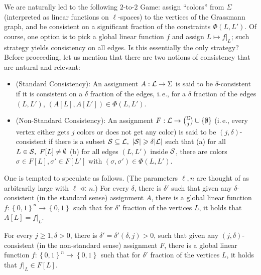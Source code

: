 \documentclass[11pt]{article}
\numberwithin{equation}{section}
\theoremstyle{definition}
\theoremstyle{plain}
\newcommand{\ie}{i.\,e.}
\newcommand\set[1]{{\left\{ #1 \right\}}}
\newcommand\power[1]{\set{0,1}^{#1}}
\renewcommand\geq{\geqslant}
\begin{document}
We are naturally led to the following $2$-to-$2$ Game: assign ``colors'' from $\Sigma$ (interpreted as linear functions on $\ell$-spaces) to the vertices
 of the Grassmann graph, and be consistent on a significant fraction of the
 constraints $\Phi(L,L')$.
 Of course, one option is to pick a global linear
 function $f$ and assign $L \mapsto f|_L$; such strategy yields consistency on all edges.
 Is this essentially the only strategy? Before proceeding, let us mention that
 there are two notions of consistency that are natural and relevant:
 \begin{itemize}
 \item (Standard Consistency): An assignment $A: {\cal L} \to \Sigma$ is said to be $\delta$-consistent if it is consistent on
 a %
 $\delta$ fraction of the
       edges, \ie, for
       a %
       $\delta$ fraction of the edges $(L, L')$, $(A[L], A[L']) \in \Phi(L, L')$.
 \item (Non-Standard Consistency): An assignment $F: {\cal L} \to {\Sigma \choose j} \cup \{\emptyset\}$ (\ie, every vertex either gets $j$ colors or
        does not get any color) is said to be $(j,\delta)$-consistent if there is a subset ${\cal S} \subseteq {\cal L}, ~|{\cal S}| \geq \delta |{\cal L}|$
        such that (a) for all $ L \in {\cal S}, ~F[L] \neq  \emptyset$ (b) for all edges $(L, L')$ inside ${\cal S}$, there are colors $\sigma\in F[L], \sigma'\in F[L']$
        with $(\sigma, \sigma') \in \Phi(L,L')$.
\end{itemize}

One is tempted to speculate %
%
%
as follows. (The parameters $\ell, n$ are thought of as arbitrarily
large with $\ell \ll n$.)  %
\medskip
{} For every $\delta$, there is $\delta'$ such that given any $\delta$-consistent (in the standard sense)
   assignment $A$, there is a global linear
function $f:\power{n} \to \power{}$ such that for $\delta'$ fraction of the vertices $L$, it holds that $A[L] = f|_L$.

\medskip
{} For every $j \geq 1, \delta > 0$, there is $\delta' = \delta'(\delta,j)>0$, such that given any $(j,\delta)$-consistent (in the non-standard sense)
assignment $F$, there is a global linear
function $f:\power{n} \to \power{}$ such that for $\delta'$ fraction of the vertices $L$, it holds that $f|_L \in F[L]$.
\end{document}
